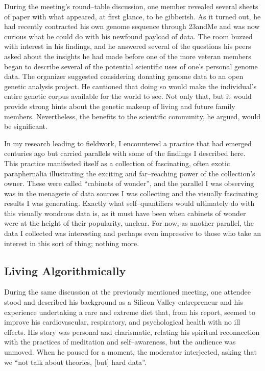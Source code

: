 \documentclass{article}
\begin{document}
During the meeting's round--table discussion,
one member revealed several sheets of paper with what appeared,
at first glance,
to be gibberish.
As it turned out,
he had recently contracted his own genome sequence through 23andMe and was now curious what he could do with his newfound payload of data.
The room buzzed with interest in his findings,
and he answered several of the questions his peers asked about the insights he had made before one of the more veteran members began to describe several of the potential scientific uses of one's personal genome data.
The organizer suggested considering donating genome data to an open genetic analysis project.
He cautioned that doing so would make the individual's entire genetic corpus available for the world to see.
Not only that,
but it would provide strong hints about the genetic makeup of living and future family members.
Nevertheless,
the benefits to the scientific community,
he argued,
would be significant.

In my research leading to fieldwork,
I encountered a practice that had emerged centuries ago but carried parallels with some of the findings I described here.
This practice manifested itself as a collection of fascinating,
often exotic paraphernalia illustrating the exciting and far--reaching power of the collection's owner.
These were called ``cabinets of wonder'',
and the parallel I was observing was in the menagerie of data sources I was collecting and the visually fascinating results I was generating.
Exactly what self--quantifiers would ultimately do with this visually wondrous data is,
as it must have been when cabinets of wonder were at the height of their popularity,
unclear.
For now,
as another parallel,
the data I collected was interesting and perhaps even impressive to those who take an interest in this sort of thing;
nothing more.

\subsection*{Living Algorithmically}
During the same discussion at the previously mentioned meeting,
one attendee stood and described his background as a Silicon Valley entrepreneur and his experience undertaking a rare and extreme diet that,
from his report,
seemed to improve his cardiovascular,
respiratory,
and psychological health with no ill effects.
His story was personal and charismatic,
relating his spiritual reconnection with the practices of meditation and self--awareness,
but the audience was unmoved.
When he paused for a moment,
the moderator interjected,
asking that we ``not talk about theories,
[but] hard data''.
\end{document}
